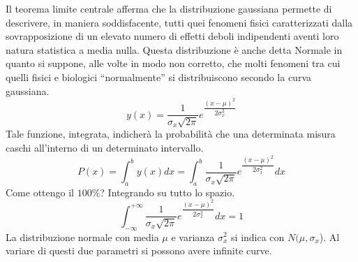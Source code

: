 \documentclass[a4paper, 15pt]{article}
\begin{document}
\begin{adjustwidth}{2in}{}
\begin{figure}[H]
 		\label{fig:screenshot002}
 	\end{figure}	
 	Il teorema limite centrale afferma che la distribuzione gaussiana permette di descrivere, in maniera soddisfacente, tutti quei fenomeni fisici caratterizzati dalla sovrapposizione di un elevato numero di effetti deboli indipendenti aventi loro natura statistica a media nulla. Questa distribuzione è anche detta Normale in quanto si suppone, alle volte in modo non corretto, che molti fenomeni tra cui quelli fisici e biologici “normalmente” si distribuiscono secondo la curva gaussiana. 	
 	\[y(x) = \dfrac{1}{\sigma_x\sqrt{2\pi}}e^{\dfrac{(x-\mu)^2}{2\sigma_x^2}}\]
 	Tale funzione, integrata, indicherà la probabilità che una determinata misura caschi all'interno di un determinato intervallo.
 	\[P(x) = \int_{a}^{b}y(x)dx = \int_{a}^{b}\dfrac{1}{\sigma_x\sqrt{2\pi}}e^{\dfrac{(x-\mu)^2}{2\sigma_x^2}}dx\]
	 Come ottengo il $100\%$? Integrando su tutto lo spazio. 
	 \[ \int_{-\infty}^{+\infty}\dfrac{1}{\sigma_x\sqrt{2\pi}}e^{\dfrac{(x-\mu)^2}{2\sigma_x^2}}dx = 1\]
	 La distribuzione normale con media $\mu$ e varianza $ \sigma_x^2 $ si indica con $ N(\mu,\sigma_x $). Al variare di questi due parametri si possono avere infinite curve.\newline 
	 

\end{adjustwidth}
\end{document}
